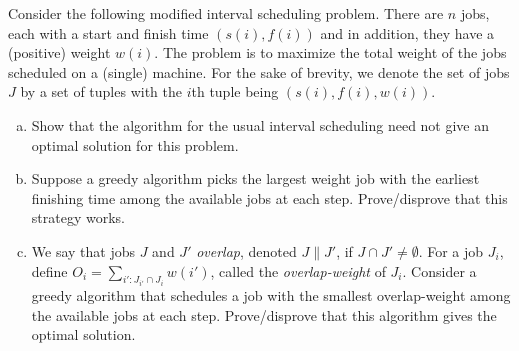 \begin{exercise}
	Consider the following modified interval scheduling problem. There are $n$ jobs, each with a start and finish time $(s(i),f(i))$ and in addition, they have a (positive) weight $w(i)$. The problem is to maximize the total weight of the jobs scheduled on a (single) machine. For the sake of brevity, we denote the set of jobs $J$ by a set of tuples with the $i$th tuple being $(s(i),f(i),w(i))$.
	\begin{enumerate}[(a)]
		\item Show that the algorithm for the usual interval scheduling need not give an optimal solution for this problem.
		
		\item Suppose a greedy algorithm picks the largest weight job with the earliest finishing time among the available jobs at each step. Prove/disprove that this strategy works.
		
		\item We say that jobs $J$ and $J'$ \textit{overlap}, denoted $J\| J'$, if $J\cap J'\neq\emptyset$. For a job $J_i$, define $O_i = \sum_{i':J_{i'}\cap J_i} w(i')$, called the \textit{overlap-weight} of $J_i$. Consider a greedy algorithm that schedules a job with the smallest overlap-weight among the available jobs at each step. Prove/disprove that this algorithm gives the optimal solution.
	\end{enumerate}
\end{exercise}


